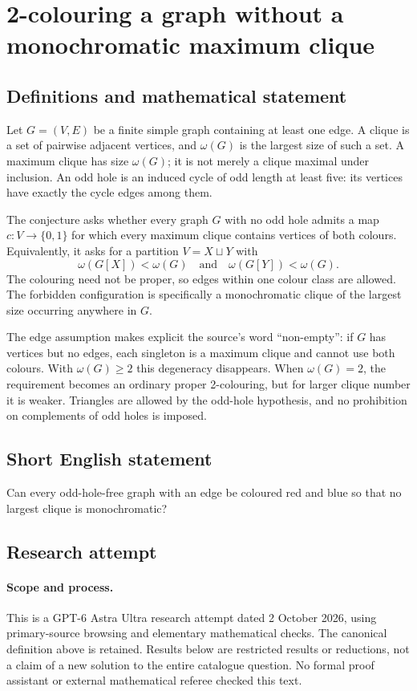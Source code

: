 \documentclass[11pt,a4paper]{article}
\begin{document}
\section*{2-colouring a graph without a monochromatic maximum clique}\label{statement}

\subsection{Definitions and mathematical statement}
Let $G=(V,E)$ be a finite simple graph containing at least one edge. A
clique is a set of pairwise adjacent vertices, and $\omega(G)$ is the
largest size of such a set. A maximum clique has size $\omega(G)$; it is
not merely a clique maximal under inclusion. An odd hole is an induced
cycle of odd length at least five: its vertices have exactly the cycle
edges among them.

The conjecture asks whether every graph $G$ with no odd hole admits a
map $c:V\to\{0,1\}$ for which every maximum clique contains vertices of
both colours. Equivalently, it asks for a partition $V=X\sqcup Y$ with
\[
                 \omega(G[X])<\omega(G)
                 \quad\text{and}\quad
                 \omega(G[Y])<\omega(G).
\]
The colouring need not be proper, so edges within one colour class are
allowed. The forbidden configuration is specifically a monochromatic
clique of the largest size occurring anywhere in $G$.

The edge assumption makes explicit the source's word ``non-empty'': if
$G$ has vertices but no edges, each singleton is a maximum clique and
cannot use both colours. With $\omega(G)\ge2$ this degeneracy disappears.
When $\omega(G)=2$, the requirement becomes an ordinary proper
2-colouring, but for larger clique number it is weaker. Triangles are
allowed by the odd-hole hypothesis, and no prohibition on complements
of odd holes is imposed.
\subsection{Short English statement}
Can every odd-hole-free graph with an edge be coloured red and blue so that no largest clique is monochromatic?
\subsection{Research attempt}
\paragraph{Scope and process.}
This is a GPT-6 Astra Ultra research attempt dated 2 October 2026, using
primary-source browsing and elementary mathematical checks. The canonical
definition above is retained. Results below are restricted results or
reductions, not a claim of a new solution to the entire catalogue question.
No formal proof assistant or external mathematical referee checked this text.
\end{document}
